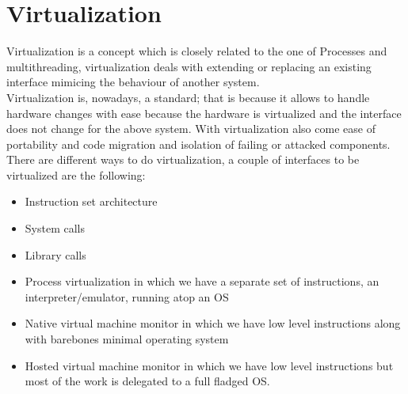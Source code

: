 \section{Virtualization}
Virtualization is a concept which is closely related to the one of Processes and multithreading, virtualization deals with extending or replacing an existing interface mimicing the behaviour of another system. \\
Virtualization is, nowadays, a standard; that is because it allows to handle hardware changes with ease because the hardware is virtualized and the interface does not change for the above system. With virtualization also come ease of portability and code migration and isolation of failing or attacked components. \\
There are different ways to do virtualization, a couple of interfaces to be virtualized are the following:
\begin{itemize}
    \item Instruction set architecture
    \item System calls
    \item Library calls
    \item Process virtualization in which we have a separate set of instructions, an interpreter/emulator, running atop an OS
    \item Native virtual machine monitor in which we have low level instructions along with barebones minimal operating system
    \item Hosted virtual machine monitor in which we have low level instructions but most of the work is delegated to a full fladged OS.
\end{itemize}
    